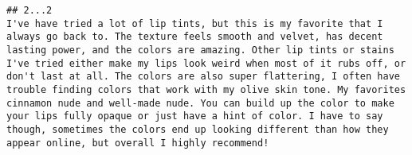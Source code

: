 \documentclass[
  11pt,
]{article}
\begin{document}
\begin{verbatim}
## 2...2                                                                                                                                                                                                                                                                                                                                                                                                                                                                                                                                                                                                                                                                                                                                                                                                                                                                                                                                                                                                                                                                                                                                                                                                                                                                                                                                     I've have tried a lot of lip tints, but this is my favorite that I always go back to. The texture feels smooth and velvet, has decent lasting power, and the colors are amazing. Other lip tints or stains I've tried either make my lips look weird when most of it rubs off, or don't last at all. The colors are also super flattering, I often have trouble finding colors that work with my olive skin tone. My favorites cinnamon nude and well-made nude. You can build up the color to make your lips fully opaque or just have a hint of color. I have to say though, sometimes the colors end up looking different than how they appear online, but overall I highly recommend!

\end{verbatim}
\end{document}
